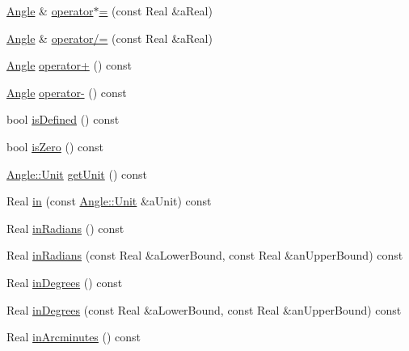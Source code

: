 \begin{DoxyCompactItemize}
\item 
\hyperlink{classlibrary_1_1math_1_1geom_1_1_angle}{Angle} \& \hyperlink{classlibrary_1_1math_1_1geom_1_1_angle_aa8e7869f7558f5b67e05709202578477}{operator$\ast$=} (const Real \&a\+Real)
\item 
\hyperlink{classlibrary_1_1math_1_1geom_1_1_angle}{Angle} \& \hyperlink{classlibrary_1_1math_1_1geom_1_1_angle_af5be3a64b8fca052be8467dfdf7cdc79}{operator/=} (const Real \&a\+Real)
\item 
\hyperlink{classlibrary_1_1math_1_1geom_1_1_angle}{Angle} \hyperlink{classlibrary_1_1math_1_1geom_1_1_angle_a184ea8e3b505102eebb66d24e09f242c}{operator+} () const
\item 
\hyperlink{classlibrary_1_1math_1_1geom_1_1_angle}{Angle} \hyperlink{classlibrary_1_1math_1_1geom_1_1_angle_abe1c9f5da609e0d398b11d0c1e785b42}{operator-\/} () const
\item 
bool \hyperlink{classlibrary_1_1math_1_1geom_1_1_angle_aacac805eb7025d5eae8a4ccce67a3c4a}{is\+Defined} () const
\item 
bool \hyperlink{classlibrary_1_1math_1_1geom_1_1_angle_a659723e1e0c356771b9ceb4c51dfd770}{is\+Zero} () const
\item 
\hyperlink{classlibrary_1_1math_1_1geom_1_1_angle_ab593c4dafbb9a5c29fdbe114eaae8eae}{Angle\+::\+Unit} \hyperlink{classlibrary_1_1math_1_1geom_1_1_angle_a68d7f79c9c8111f4f3f4b44d0a9eea99}{get\+Unit} () const
\item 
Real \hyperlink{classlibrary_1_1math_1_1geom_1_1_angle_ade7cdca64f1f5c6df4f9d1398eb36edc}{in} (const \hyperlink{classlibrary_1_1math_1_1geom_1_1_angle_ab593c4dafbb9a5c29fdbe114eaae8eae}{Angle\+::\+Unit} \&a\+Unit) const
\item 
Real \hyperlink{classlibrary_1_1math_1_1geom_1_1_angle_a3133ddf1e8355947884e6aa13cda8e50}{in\+Radians} () const
\item 
Real \hyperlink{classlibrary_1_1math_1_1geom_1_1_angle_aa4a43ad4e97529067d50e34f00ef2f80}{in\+Radians} (const Real \&a\+Lower\+Bound, const Real \&an\+Upper\+Bound) const
\item 
Real \hyperlink{classlibrary_1_1math_1_1geom_1_1_angle_aab91bb7d5e64abf78651d0bd5814f47a}{in\+Degrees} () const
\item 
Real \hyperlink{classlibrary_1_1math_1_1geom_1_1_angle_ac01d30a33cced48f01ce90e3740c37e0}{in\+Degrees} (const Real \&a\+Lower\+Bound, const Real \&an\+Upper\+Bound) const
\item 
Real \hyperlink{classlibrary_1_1math_1_1geom_1_1_angle_a91406717714cf457ce83aced432ac58f}{in\+Arcminutes} () const

\end{DoxyCompactItemize}
